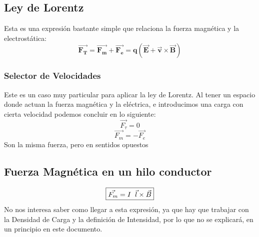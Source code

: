 \subsection{Ley de Lorentz}
\noindent Esta es una expresión bastante simple que relaciona la fuerza magnética y la electrostática:
\[
        \boxed{\bm{\vec{F_T} =\vec{F_m} + \vec{F_e} =q(\vec{E} + \vec{v}\times\vec{B})}}
\]
\subsubsection{Selector de Velocidades}
\begin{wrapfigure}{r}{4cm}
\end{wrapfigure}
\noindent Este es un caso muy particular para aplicar la ley de Lorentz. Al tener un espacio donde actuan la fuerza magnética y la eléctrica, e introducimos una carga con cierta velocidad podemos concluir en lo siguiente:
\[
        \vec{F_{\tau}}=0
\]
\[
        \boxed{\vec{F_m} = -\vec{F_e}}
\]
Son la misma fuerza, pero en sentidos opuestos
\subsection{Fuerza Magnética en un hilo conductor}
\[
        \boxed{\vec{F_m} = I \hspace{2mm}\vec{l}\times\vec{B}}
\]
No nos interesa saber como llegar a esta expresión, ya que hay que trabajar con la Densidad de Carga y la definición de Intensidad, por lo que no se explicará, en un principio en este documento.

